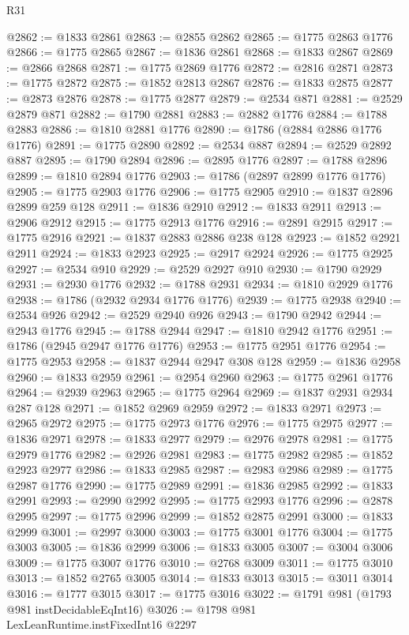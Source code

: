 \begin{lexlean}{R31}
\begin{coremodule}
@2862 := @1833 @2861
@2863 := @2855 @2862
@2865 := @1775 @2863 @1776
@2866 := @1775 @2865
@2867 := @1836 @2861
@2868 := @1833 @2867
@2869 := @2866 @2868
@2871 := @1775 @2869 @1776
@2872 := @2816 @2871
@2873 := @1775 @2872
@2875 := @1852 @2813 @2867
@2876 := @1833 @2875
@2877 := @2873 @2876
@2878 := @1775 @2877
@2879 := @2534 @871
@2881 := @2529 @2879 @871
@2882 := @1790 @2881
@2883 := @2882 @1776
@2884 := @1788 @2883
@2886 := @1810 @2881 @1776
@2890 := @1786 (@2884 @2886 @1776 @1776)
@2891 := @1775 @2890
@2892 := @2534 @887
@2894 := @2529 @2892 @887
@2895 := @1790 @2894
@2896 := @2895 @1776
@2897 := @1788 @2896
@2899 := @1810 @2894 @1776
@2903 := @1786 (@2897 @2899 @1776 @1776)
@2905 := @1775 @2903 @1776
@2906 := @1775 @2905
@2910 := @1837 @2896 @2899 @259 @128
@2911 := @1836 @2910
@2912 := @1833 @2911
@2913 := @2906 @2912
@2915 := @1775 @2913 @1776
@2916 := @2891 @2915
@2917 := @1775 @2916
@2921 := @1837 @2883 @2886 @238 @128
@2923 := @1852 @2921 @2911
@2924 := @1833 @2923
@2925 := @2917 @2924
@2926 := @1775 @2925
@2927 := @2534 @910
@2929 := @2529 @2927 @910
@2930 := @1790 @2929
@2931 := @2930 @1776
@2932 := @1788 @2931
@2934 := @1810 @2929 @1776
@2938 := @1786 (@2932 @2934 @1776 @1776)
@2939 := @1775 @2938
@2940 := @2534 @926
@2942 := @2529 @2940 @926
@2943 := @1790 @2942
@2944 := @2943 @1776
@2945 := @1788 @2944
@2947 := @1810 @2942 @1776
@2951 := @1786 (@2945 @2947 @1776 @1776)
@2953 := @1775 @2951 @1776
@2954 := @1775 @2953
@2958 := @1837 @2944 @2947 @308 @128
@2959 := @1836 @2958
@2960 := @1833 @2959
@2961 := @2954 @2960
@2963 := @1775 @2961 @1776
@2964 := @2939 @2963
@2965 := @1775 @2964
@2969 := @1837 @2931 @2934 @287 @128
@2971 := @1852 @2969 @2959
@2972 := @1833 @2971
@2973 := @2965 @2972
@2975 := @1775 @2973 @1776
@2976 := @1775 @2975
@2977 := @1836 @2971
@2978 := @1833 @2977
@2979 := @2976 @2978
@2981 := @1775 @2979 @1776
@2982 := @2926 @2981
@2983 := @1775 @2982
@2985 := @1852 @2923 @2977
@2986 := @1833 @2985
@2987 := @2983 @2986
@2989 := @1775 @2987 @1776
@2990 := @1775 @2989
@2991 := @1836 @2985
@2992 := @1833 @2991
@2993 := @2990 @2992
@2995 := @1775 @2993 @1776
@2996 := @2878 @2995
@2997 := @1775 @2996
@2999 := @1852 @2875 @2991
@3000 := @1833 @2999
@3001 := @2997 @3000
@3003 := @1775 @3001 @1776
@3004 := @1775 @3003
@3005 := @1836 @2999
@3006 := @1833 @3005
@3007 := @3004 @3006
@3009 := @1775 @3007 @1776
@3010 := @2768 @3009
@3011 := @1775 @3010
@3013 := @1852 @2765 @3005
@3014 := @1833 @3013
@3015 := @3011 @3014
@3016 := @1777 @3015
@3017 := @1775 @3016
@3022 := @1791 @981 (@1793 @981 instDecidableEqInt16)
@3026 := @1798 @981 LexLeanRuntime.instFixedInt16 @2297

\end{coremodule}
\end{lexlean}
